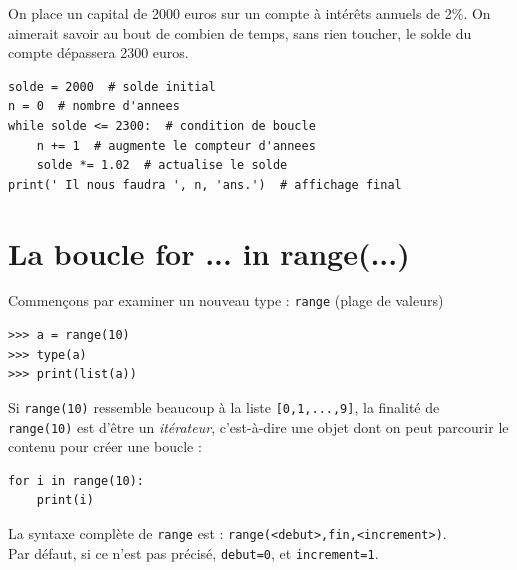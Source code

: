 On place un capital de 2000 euros sur un compte à intérêts annuels de 2\%. On aimerait savoir au bout de combien de temps, sans rien toucher, le 
solde du compte dépassera 2300 euros.\\

\begin{pyc}
\begin{verbatim}
solde = 2000  # solde initial
n = 0  # nombre d'annees
while solde <= 2300:  # condition de boucle
    n += 1  # augmente le compteur d'annees
    solde *= 1.02  # actualise le solde
print(' Il nous faudra ', n, 'ans.')  # affichage final   
\end{verbatim}
\end{pyc}

\section{La boucle for ... in range(...)}

Commençons par examiner un nouveau type : \texttt{range} (plage de valeurs)

\begin{pyc}
\begin{verbatim}
>>> a = range(10)
>>> type(a)
>>> print(list(a))
\end{verbatim}
\end{pyc}

Si \texttt{range(10)} ressemble beaucoup à la liste \texttt{[0,1,...,9]}, la finalité de \\\texttt{range(10)} est d'être un \textit{itérateur}, 
c'est-à-dire une objet dont on peut parcourir le contenu pour créer une boucle :

\begin{pyc}
\begin{verbatim}
for i in range(10):
    print(i)
\end{verbatim}
\end{pyc}
La syntaxe complète de \texttt{range} est : \texttt{range(<debut>,fin,<increment>)}.\\

Par défaut, si ce n'est pas précisé, \texttt{debut=0}, et \texttt{increment=1}.\\

